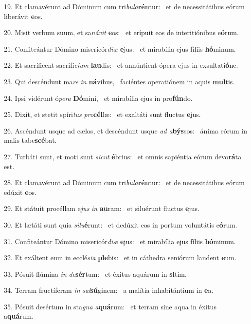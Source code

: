 19. Et clamavérunt ad Dóminum cum tri\textit{bu}\textit{la}\textbf{rén}tur: \ast\  et de necessitátibus eórum liberávit \textbf{e}os.\

20. Misit verbum suum, et sa\textit{ná}\textit{vit} \textbf{e}os: \ast\  et erípuit eos de interitiónibus e\textbf{ó}rum.\

21. Confiteántur Dómino misericór\textit{di}\textit{æ} \textbf{e}jus: \ast\  et mirabília ejus fíliis \textbf{hó}minum.\

22. Et sacríficent sacrifí\textit{ci}\textit{um} \textbf{lau}dis: \ast\  et annúntient ópera ejus in exsultati\textbf{ó}ne.\

23. Qui descéndunt ma\textit{re} \textit{in} \textbf{ná}vibus, \ast\  faciéntes operatiónem in aquis \textbf{mul}tis.\

24. Ipsi vidérunt ó\textit{pe}\textit{ra} \textbf{Dó}mini, \ast\  et mirabília ejus in pro\textbf{fún}do.\

25. Dixit, et stetit spíri\textit{tus} \textit{pro}\textbf{cél}læ: \ast\  et exaltáti sunt fluctus \textbf{e}jus.\

26. Ascéndunt usque ad cælos, et descéndunt usque \textit{ad} \textit{a}\textbf{býs}sos: \ast\  ánima eórum in malis tabe\textbf{scé}bat.\

27. Turbáti sunt, et moti sunt \textit{sic}\textit{ut} \textbf{é}brius: \ast\  et omnis sapiéntia eórum devo\textbf{rá}ta est.\

28. Et clamavérunt ad Dóminum cum tri\textit{bu}\textit{la}\textbf{rén}tur: \ast\  et de necessitátibus eórum edúxit \textbf{e}os.\

29. Et státuit procéllam e\textit{jus} \textit{in} \textbf{au}ram: \ast\  et siluérunt fluctus \textbf{e}jus.\

30. Et lætáti sunt quia \textit{si}\textit{lu}\textbf{é}runt: \ast\  et dedúxit eos in portum voluntátis e\textbf{ó}rum.\

31. Confiteántur Dómino misericór\textit{di}\textit{æ} \textbf{e}jus: \ast\  et mirabília ejus fíliis \textbf{hó}minum.\

32. Et exáltent eum in ecclé\textit{si}\textit{a} \textbf{ple}bis: \ast\  et in cáthedra seniórum laudent \textbf{e}um.\

33. Pósuit flúmina \textit{in} \textit{de}\textbf{sér}tum: \ast\  et éxitus aquárum in \textbf{si}tim.\

34. Terram fructíferam \textit{in} \textit{sal}\textbf{sú}ginem: \ast\  a malítia inhabitántium in \textbf{e}a.\

35. Pósuit desértum in sta\textit{gna} \textit{a}\textbf{quá}rum: \ast\  et terram sine aqua in éxitus a\textbf{quá}rum.\

